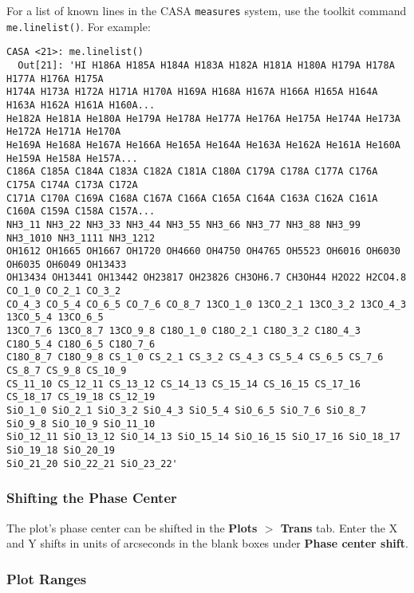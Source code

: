For a list of known lines in the CASA {\tt measures} system, use the toolkit command {\tt me.linelist()}.  For example:
\small
\begin{verbatim}
CASA <21>: me.linelist()
  Out[21]: 'HI H186A H185A H184A H183A H182A H181A H180A H179A H178A H177A H176A H175A 
H174A H173A H172A H171A H170A H169A H168A H167A H166A H165A H164A H163A H162A H161A H160A... 
He182A He181A He180A He179A He178A He177A He176A He175A He174A He173A He172A He171A He170A 
He169A He168A He167A He166A He165A He164A He163A He162A He161A He160A He159A He158A He157A...
C186A C185A C184A C183A C182A C181A C180A C179A C178A C177A C176A C175A C174A C173A C172A 
C171A C170A C169A C168A C167A C166A C165A C164A C163A C162A C161A C160A C159A C158A C157A... 
NH3_11 NH3_22 NH3_33 NH3_44 NH3_55 NH3_66 NH3_77 NH3_88 NH3_99 NH3_1010 NH3_1111 NH3_1212 
OH1612 OH1665 OH1667 OH1720 OH4660 OH4750 OH4765 OH5523 OH6016 OH6030 OH6035 OH6049 OH13433 
OH13434 OH13441 OH13442 OH23817 OH23826 CH3OH6.7 CH3OH44 H2O22 H2CO4.8 CO_1_0 CO_2_1 CO_3_2 
CO_4_3 CO_5_4 CO_6_5 CO_7_6 CO_8_7 13CO_1_0 13CO_2_1 13CO_3_2 13CO_4_3 13CO_5_4 13CO_6_5 
13CO_7_6 13CO_8_7 13CO_9_8 C18O_1_0 C18O_2_1 C18O_3_2 C18O_4_3 C18O_5_4 C18O_6_5 C18O_7_6 
C18O_8_7 C18O_9_8 CS_1_0 CS_2_1 CS_3_2 CS_4_3 CS_5_4 CS_6_5 CS_7_6 CS_8_7 CS_9_8 CS_10_9 
CS_11_10 CS_12_11 CS_13_12 CS_14_13 CS_15_14 CS_16_15 CS_17_16 CS_18_17 CS_19_18 CS_12_19 
SiO_1_0 SiO_2_1 SiO_3_2 SiO_4_3 SiO_5_4 SiO_6_5 SiO_7_6 SiO_8_7 SiO_9_8 SiO_10_9 SiO_11_10 
SiO_12_11 SiO_13_12 SiO_14_13 SiO_15_14 SiO_16_15 SiO_17_16 SiO_18_17 SiO_19_18 SiO_20_19 
SiO_21_20 SiO_22_21 SiO_23_22'
\end{verbatim}
\normalsize


\subsubsection{Shifting the Phase Center}
\label{section:edit.plot.plotms.phcen}

The plot's phase center can be shifted in the {\bf Plots $>$ Trans} tab. Enter the X and Y shifts in units of arcseconds in the blank boxes under {\bf Phase center shift}.


\subsubsection{Plot Ranges}
\label{section:edit.plot.plotms.range}


